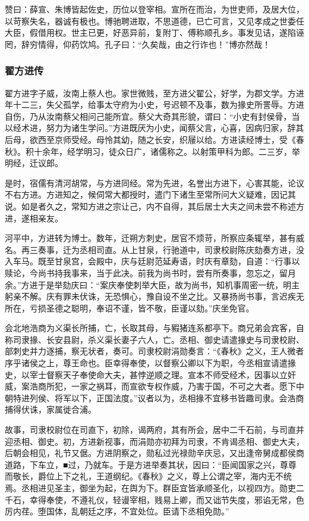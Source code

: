 \documentclass[]{article}
\begin{document}
赞曰：薛宣、朱博皆起佐史，历位以登宰相。宣所在而治，为世吏师，及居大位，以苛察失名，器诚有极也。博驰聘进取，不思道德，已亡可言，又见孝成之世委任大臣，假借用权。世主已更，好恶异前，复附丁、傅称顺孔乡。事发见诘，遂陷诬罔，辞穷情得，仰药饮鸠。孔子曰：``久矣哉，由之行诈也！''博亦然哉！

\hypertarget{header-n5723}{%
\subsubsection{翟方进传}\label{header-n5723}}

翟方进字子威，汝南上蔡人也。家世微贱，至方进父翟公，好学，为郡文学。方进年十二三，失父孤学，给事太守府为小史，号迟顿不及事，数为掾史所詈辱。方进自伤，乃从汝南蔡父相问己能所宜。蔡父大奇其形貌，谓曰：``小史有封侯骨，当以经术进，努力为诸生学问。''方进既厌为小史，闻蔡父言，心喜，因病归家，辞其后母，欲西至京师受经。母怜其幼，随之长安，织屦以给。方进读经博士，受《春秋》。积十余年，经学明习，徒众日广，诸儒称之。以射策甲科为郎。二三岁，举明经，迁议郎。

是时，宿儒有清河胡常，与方进同经。常为先进，名誉出方进下，心害其能，论议不右方进。方进知之，候伺常大都授时，遣门下诸生至常所问大义疑难，因记其说。如是者久之，常知方进之宗让己，内不自得，其后居士大夫之间未尝不称述方进，遂相亲友。

河平中，方进转为博士。数年，迁朔方刺史，居官不烦苛，所察应条辄举，甚有威名。再三奏事，迁为丞相司直。从上甘泉，行驰道中，司隶校尉陈庆劾奏方进，没入车马。既至甘泉宫，会殿中，庆与廷尉范延寿语，时庆有章劾，自道：``行事以赎论，今尚书持我事来，当于此决。前我为尚书时，尝有所奏事，忽忘之，留月余。''方进于是举劾庆曰：``案庆奉使刺举大臣，故为尚书，知机事周密一统，明主躬亲不解。庆有罪未伏诛，无恐惧心，豫自设不坐之比。又暴扬尚书事，言迟疾无所在，亏损圣德之聪明，奉诏不谨，皆不敬，臣谨以劾。''庆坐免官。

会北地浩商为义渠长所捕，亡，长取其母，与豭猪连系都亭下。商兄弟会宾客，自称司隶掾、长安县尉，杀义渠长妻子六人，亡。丞相、御史请遣掾史与司隶校尉、部刺史并力逐捕，察无状者，奏可。司隶校尉涓勋奏言：``《春秋》之义，王人微者序乎诸侯之上，尊王命也。臣幸得奉使，以督察公卿以下为职，今丞相宣请遣掾史，以宰士督察天子奉使命大夫，甚悖逆顺之理。宣本不师受经术，因事以立奸威，案浩商所犯，一家之祸耳，而宣欲专权作威，乃害于国，不可之大者。愿下中朝特进列侯、将军以下，正国法度。''议者以为，丞相掾不宜移书皆趣司隶。会浩商捕得伏诛，家属徙合浦。

故事，司隶校尉位在司直下，初除，谒两府，其有所会，居中二千石前，与司直并迎丞相、御史。初，方进新视事，而涓勋亦初拜为司隶，不肯谒丞相、御史大夫，后朝会相见，礼节又倨。方进阴察之，勋私过光禄勋辛庆忌，又出逢帝舅成都侯商道路，下车立，■过，乃就车。于是方进举奏其状，因曰：``臣闻国家之兴，尊尊而敬长，爵位上下之礼，王道纲纪。《春秋》之义，尊上公谓之宰，海内无不统焉。丞相进见圣主，御坐为起，在舆为下。群臣宜皆承顺圣化，以视四方。勋吏二千石，幸得奉使，不遵礼仪，轻谩宰相，贱易上卿，而又诎节失度，邪谄无常，色厉内荏。堕国体，乱朝廷之序，不宜处位。臣请下丞相免勋。''
\end{document}
